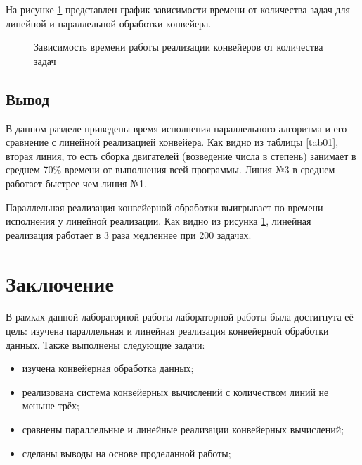 \documentclass[12pt]{report}
\begin{document}
На рисунке \ref{plt:linear-vs-parallel} представлен график зависимости времени от количества задач для линейной и параллельной обработки конвейера.

\begin{figure}[H]
	\centering
	\captionsetup{justification=centering}
	\caption{Зависимость времени работы реализации конвейеров от количества задач}
	\label{plt:linear-vs-parallel}
\end{figure}

\section{Вывод}

В данном разделе приведены время исполнения параллельного алгоритма и его сравнение с линейной реализацией конвейера. Как видно из таблицы \ref{tab01}, вторая линия, то есть сборка двигателей (возведение числа в степень) занимает в среднем 70\% времени от выполнения всей программы. Линия №3 в среднем работает быстрее чем линия №1.

Параллельная реализация конвейерной обработки выигрывает по времени исполнения у линейной реализации. Как видно из рисунка \ref{plt:linear-vs-parallel}, линейная реализация работает в 3 раза медленнее при 200 задачах.

\chapter*{Заключение}

В рамках данной лабораторной работы лабораторной работы была достигнута её цель: изучена параллельная и линейная реализация конвейерной обработки данных. Также выполнены следующие задачи:

\begin{itemize}
	\item изучена конвейерная обработка данных;
	\item реализована система конвейерных вычислений с количеством линий не меньше трёх;
	\item сравнены параллельные и линейные реализации конвейерных вычислений;
	\item сделаны выводы на основе проделанной работы;
\end{itemize}
\end{document}
